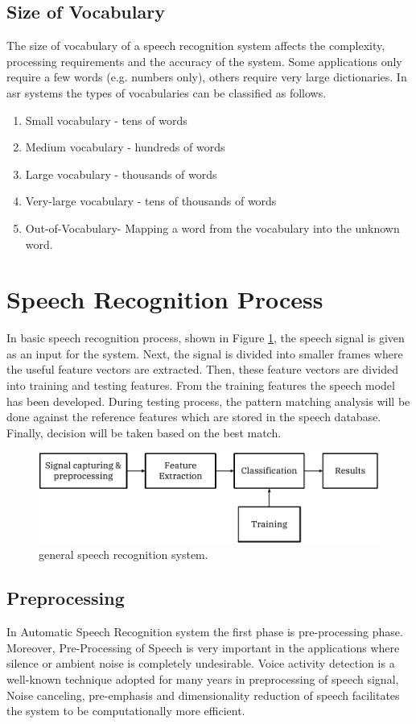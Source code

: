 \documentclass[12pt, a4paper, twoside]{report}
\begin{document}
\subsection{Size of Vocabulary}
The size of vocabulary of a speech recognition system affects the complexity, processing requirements and the accuracy of the system. Some applications only require a few words (e.g. numbers only), others require very large dictionaries. In \acrshort{asr} systems the types of vocabularies can be classified as follows.
\begin{enumerate}[noitemsep]
\item Small vocabulary - tens of words
\item Medium vocabulary - hundreds of words
\item Large vocabulary - thousands of words
\item Very-large vocabulary - tens of thousands of words
\item Out-of-Vocabulary- Mapping a word from the vocabulary into the unknown word.
\end{enumerate}
\section{Speech Recognition Process}
In basic speech recognition process, shown in Figure \ref{fig:chapter1}, the speech signal is given as an input for the system. Next, the signal is divided into smaller frames where the useful feature vectors are extracted. Then, these feature vectors are divided into training and testing features. From the training features the speech model has been developed. During testing process, the pattern matching analysis will be done against the reference features which are stored in the speech database. Finally, decision will be taken based on the best match.
\begin{figure}[!h]
	\centering
	\includegraphics[]
	{images/chapter1/chapter1}
	\caption{general speech recognition system.}
	\label{fig:chapter1}
\end{figure}

\subsection{Preprocessing}
In Automatic Speech Recognition system the first phase is pre-processing phase. Moreover, Pre-Processing of Speech is very important in the applications where silence or ambient noise is completely undesirable. Voice activity detection is a well-known technique adopted for many years in preprocessing of speech signal, Noise canceling, pre-emphasis and dimensionality reduction of speech facilitates the system to be computationally more efficient.
\end{document}

